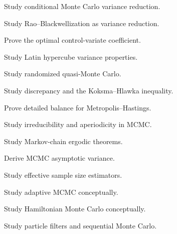 \begin{exercise}[4]
Study conditional Monte Carlo variance reduction.
\end{exercise}

\begin{exercise}[4]
Study Rao--Blackwellization as variance reduction.
\end{exercise}

\begin{exercise}[4]
Prove the optimal control-variate coefficient.
\end{exercise}

\begin{exercise}[4]
Study Latin hypercube variance properties.
\end{exercise}

\begin{exercise}[4]
Study randomized quasi-Monte Carlo.
\end{exercise}

\begin{exercise}[4]
Study discrepancy and the Koksma--Hlawka inequality.
\end{exercise}

\begin{exercise}[4]
Prove detailed balance for Metropolis--Hastings.
\end{exercise}

\begin{exercise}[4]
Study irreducibility and aperiodicity in MCMC.
\end{exercise}

\begin{exercise}[4]
Study Markov-chain ergodic theorems.
\end{exercise}

\begin{exercise}[4]
Derive MCMC asymptotic variance.
\end{exercise}

\begin{exercise}[4]
Study effective sample size estimators.
\end{exercise}

\begin{exercise}[4]
Study adaptive MCMC conceptually.
\end{exercise}

\begin{exercise}[4]
Study Hamiltonian Monte Carlo conceptually.
\end{exercise}

\begin{exercise}[4]
Study particle filters and sequential Monte Carlo.
\end{exercise}

